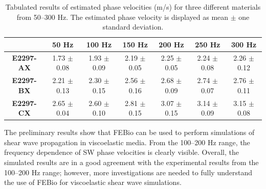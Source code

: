 \begin{table}\label{table:febio_results}
    \caption{Tabulated results of estimated phase velocities (m/s) for three
        different materials from 50--300 Hz. The estimated phase velocity is
        displayed as mean $\pm$ one standard deviation.}
    \begin{tabular}{|c|c|c|c|c|c|c|}
        \hline
         & \textbf{50 Hz} & \textbf{100 Hz} & \textbf{150 Hz} & \textbf{200 Hz} & \textbf{250 Hz} & \textbf{300 Hz} \\
         \hline
         \textbf{E2297-AX} & 1.73 $\pm$ 0.08 & 1.93 $\pm$ 0.09 & 2.19 $\pm$ 0.05 & 2.25 $\pm$ 0.05 & 2.24 $\pm$ 0.08 & 2.26 $\pm$ 0.12 \\
         \textbf{E2297-BX} & 2.21 $\pm$ 0.13 & 2.30 $\pm$ 0.15 & 2.56 $\pm$ 0.16 & 2.68 $\pm$ 0.09 & 2.74 $\pm$ 0.07 & 2.76 $\pm$ 0.11 \\
         \textbf{E2297-CX} & 2.65 $\pm$ 0.04 & 2.60 $\pm$ 0.10 & 2.81 $\pm$ 0.15 & 3.07 $\pm$ 0.15 & 3.14 $\pm$ 0.09 & 3.15 $\pm$ 0.08 \\
        \hline
    \end{tabular}
\end{table}

The preliminary results show that FEBio can be used to perform simulations of
shear wave propagation in viscoelastic media. From the 100--200 Hz range, the
frequency dependence of SW phase velocities is clearly visible. Overall, the
simulated results are in a good agreement with the experimental results from
the 100--200 Hz range; however, more investigations are needed to fully
understand the use of FEBio for viscoelastic shear wave simulations.
